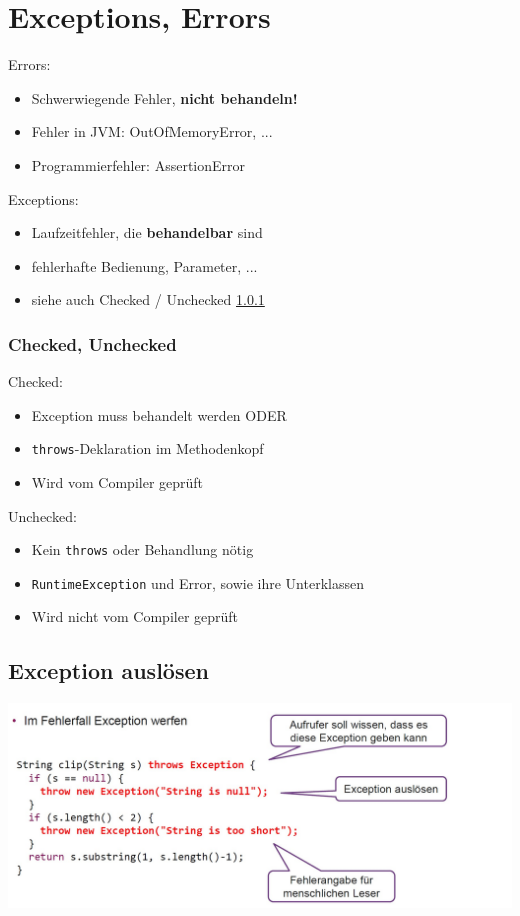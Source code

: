 \section{Exceptions, Errors}
Errors:
\begin{itemize}
    \itemsep0em
    \item Schwerwiegende Fehler, \textbf{nicht behandeln!}
    \item Fehler in JVM: OutOfMemoryError, ...
    \item Programmierfehler: AssertionError
\end{itemize}
Exceptions:
\begin{itemize}
    \itemsep0em
    \item Laufzeitfehler, die \textbf{behandelbar} sind
    \item fehlerhafte Bedienung, Parameter, ...
    \item siehe auch Checked / Unchecked \ref{checked,unchecked}
\end{itemize}

\subsubsection{Checked, Unchecked}\label{checked,unchecked}
Checked:
\begin{itemize}
    \itemsep0em
    \item Exception muss behandelt werden ODER
    \item \verb|throws|-Deklaration im Methodenkopf
    \item Wird vom Compiler geprüft
\end{itemize}

Unchecked:
\begin{itemize}
    \itemsep0em
    \item Kein \verb|throws| oder Behandlung nötig
    \item \verb|RuntimeException| und Error, sowie ihre Unterklassen
    \item Wird nicht vom Compiler geprüft
\end{itemize}

\subsection{Exception auslösen}
\includegraphics[width=\linewidth]{pictures/exception-throw.jpg}

